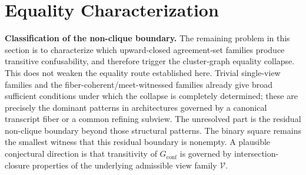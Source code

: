 \section{Equality Characterization}\label{sec:equality}

\medskip
\noindent\textbf{Classification of the non-clique boundary.} The remaining problem in this section is to characterize which upward‑closed agreement‑set families produce transitive confusability, and therefore trigger the cluster‑graph equality collapse. This does not weaken the equality route established here. Trivial single-view families and the fiber-coherent/meet-witnessed families already give broad sufficient conditions under which the collapse is completely determined; these are precisely the dominant patterns in architectures governed by a canonical transcript fiber or a common refining subview. The unresolved part is the residual non-clique boundary beyond those structural patterns. The binary square remains the smallest witness that this residual boundary is nonempty. A plausible conjectural direction is that transitivity of $G_{\mathrm{conf}}$ is governed by intersection-closure properties of the underlying admissible view family $\mathcal V$.

